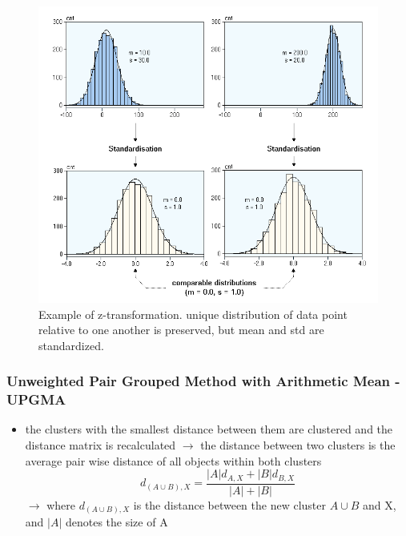 \documentclass[12pt,a4paper]{article}
\begin{document}
\begin{figure}
  \centering
  \includegraphics[width=.5\linewidth]{Images/z-trafo.png}
  \caption[Example of z-transformation]{Example of z-transformation. unique distribution of data point relative to one another is preserved, but mean and std are standardized.}
  \label{fig:z-trafo}
\end{figure}

\subsubsection{Unweighted Pair Grouped Method with Arithmetic Mean - UPGMA} %
\label{ssub:unweighted_pair_groupd_method_with_arithmetic_mean_upgma}
\begin{itemize}
  \item the clusters with the smallest distance between them are clustered and the distance matrix is recalculated
  \newline \indent $\longrightarrow$ the distance between two clusters is the average pair wise distance of all objects within both clusters
  \begin{equation}
    d_{(A \cup B), X} = \frac{|A| d_{A,X} + |B| d_{B,X}}{|A| + |B|}
  \end{equation}
  \indent $\longrightarrow$ where $d_{(A \cup B), X}$ is the distance between the new cluster $A \cup B$ and X, and $|A|$ denotes the size of A
\end{itemize}
\end{document}
